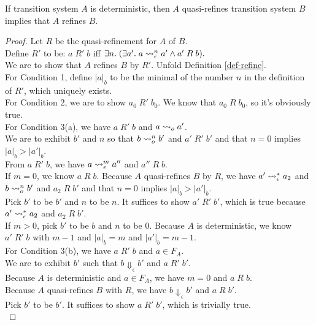 \begin{lemma} \label{lemma-quasi}
  If transition system $A$ is deterministic, then $A$ quasi-refines transition system $B$ implies that $A$ refines $B$.
\end{lemma}
\begin{proof}
  Let $R$ be the quasi-refinement for $A$ of $B$. \\
  Define $R'$ to be: $a\;R'\;b$ iff $\exists n.\;(\exists a'.\;a\leadsto^n_\epsilon a' \wedge a'\;R\;b).$ \\
  We are to show that $A$ refines $B$ by $R'$. Unfold Definition \ref{def-refine}. \\
  For Condition 1, define $|a|_b$ to be the minimal of the number $n$ in the definition of $R'$, which uniquely exists. \\
  For Condition 2, we are to show $a_0\;R'\;b_0$. We know that $a_0\;R\;b_0$, so it's obviously true. \\
  For Condition 3(a), we have $a\;R'\;b$ and $a\leadsto_o a'$. \\
  We are to exhibit $b'$ and $n$ so that $b\leadsto^n_o b'$ and $a'\;R'\;b'$ and that $n=0$ implies $|a|_b>|a'|_b$. \\
  From $a\;R'\;b$, we have $a\leadsto^m_\epsilon a''$ and $a''\;R\;b$. \\
  If $m=0$, we know $a\;R\;b$. Because $A$ quasi-refines $B$ by $R$, we have $a'\leadsto^*_\epsilon a_2$ and $b\leadsto^n_o b'$ and $a_2\;R\;b'$ and that $n=0$ implies $|a|_b>|a'|_b$. \\
  Pick $b'$ to be $b'$ and $n$ to be $n$. It suffices to show $a'\;R'\;b'$, which is true because $a'\leadsto^*_\epsilon a_2$ and $a_2\;R\;b'$. \\
  If $m>0$, pick $b'$ to be $b$ and $n$ to be 0. Because $A$ is deterministic, we know $a'\;R'\;b$ with $m-1$ and $|a|_b=m$ and $|a'|_b=m-1$. \\
  For Condition 3(b), we have $a\;R'\;b$ and $a\in F_A$. \\
  We are to exhibit $b'$ such that $b\Downarrow_\epsilon b'$ and $a\;R'\;b'$. \\
  Because $A$ is deterministic and $a\in F_A$, we have $m=0$ and $a\;R\;b$. \\
  Because $A$ quasi-refines $B$ with $R$, we have $b\Downarrow_\epsilon b'$ and $a\;R\;b'$. \\
  Pick $b'$ to be $b'$. It suffices to show $a\;R'\;b'$, which is trivially true. \\
\end{proof}

